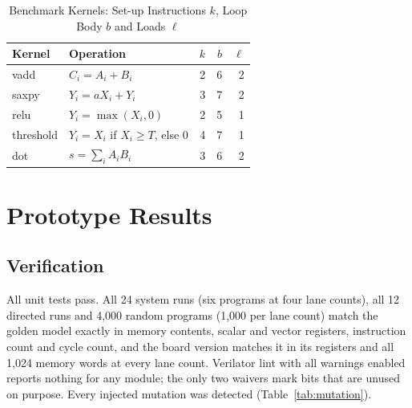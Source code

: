 \documentclass[journal]{IEEEtran}
\begin{document}
\begin{table}[t]
\centering
\caption{Benchmark Kernels: Set-up Instructions $k$, Loop Body $b$ and Loads $\ell$}
\label{tab:kernels}
\footnotesize
\begin{tabular}{llrrr}
\toprule
Kernel & Operation & $k$ & $b$ & $\ell$ \\
\midrule
vadd      & $C_i = A_i + B_i$                      & 2 & 6 & 2 \\
saxpy     & $Y_i = a X_i + Y_i$                    & 3 & 7 & 2 \\
relu      & $Y_i = \max(X_i, 0)$                   & 2 & 5 & 1 \\
threshold & $Y_i = X_i$ if $X_i \ge T$, else 0     & 4 & 7 & 1 \\
dot       & $s = \sum_i A_i B_i$                   & 3 & 6 & 2 \\
\bottomrule
\end{tabular}
\end{table}

\section{Prototype Results}\label{sec:results}

\subsection{Verification}
All unit tests pass. All 24 system runs (six programs at four lane counts), all 12
directed runs and 4,000 random programs (1,000 per lane count) match the golden model
exactly in memory contents, scalar and vector registers, instruction count and cycle
count, and the board version matches it in its registers and all 1,024 memory words at
every lane count. Verilator lint with all warnings enabled reports nothing for any
module; the only two waivers mark bits that are unused on purpose. Every injected
mutation was detected (Table~\ref{tab:mutation}).
\end{document}
